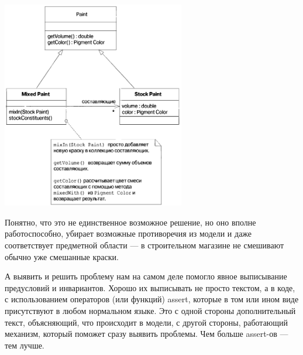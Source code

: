 \documentclass[a5paper]{article}
\begin{document}
\begin{center}
    \includegraphics[width=0.6\textwidth]{stockPaints.png}
\end{center}

Понятно, что это не единственное возможное решение, но оно вполне работоспособно, убирает возможные противоречия из модели и даже соответствует предметной области --- в строительном магазине не смешивают обычно уже смешанные краски.

А выявить и решить проблему нам на самом деле помогло явное выписывание предусловий и инвариантов. Хорошо их выписывать не просто текстом, а в коде, с использованием операторов (или функций) assert, которые в том или ином виде присутствуют в любом нормальном языке. Это с одной стороны дополнительный текст, объясняющий, что происходит в модели, с другой стороны, работающий механизм, который поможет сразу выявить проблемы. Чем больше assert-ов --- тем лучше.
\end{document}
